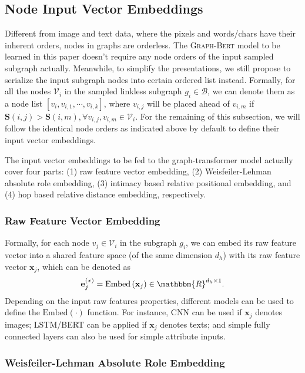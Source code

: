 \documentclass{article}
\newcommand{\mb}{\mathbf}
\newcommand{\mc}{\mathcal}
\newcommand{\our}{\textsc{Graph-Bert}}
\begin{document}
\subsection{Node Input Vector Embeddings}


Different from image and text data, where the pixels and words/chars have their inherent orders, nodes in graphs are orderless. The {\our} model to be learned in this paper doesn't require any node orders of the input sampled subgraph actually. Meanwhile, to simplify the presentations, we still propose to serialize the input subgraph nodes into certain ordered list instead. Formally, for all the nodes $\mc{V}_i$ in the sampled linkless subgraph $g_i \in \mc{B}$, we can denote them as a node list $[v_i, v_{i,1}, \cdots, v_{i,k}]$, where $v_{i,j}$ will be placed ahead of $v_{i,m}$ if $\mb{S}(i,j) > \mb{S}(i,m), \forall v_{i,j}, v_{i,m} \in \mc{V}_i$. For the remaining of this subsection, we will follow the identical node orders as indicated above by default to define their input vector embeddings.

The input vector embeddings to be fed to the graph-transformer model actually cover four parts: (1) raw feature vector embedding, (2) Weisfeiler-Lehman absolute role embedding, (3) intimacy based relative positional embedding, and (4) hop based relative distance embedding, respectively. 



\subsubsection{Raw Feature Vector Embedding}

Formally, for each node $v_j \in \mc{V}_i$ in the subgraph $g_i$, we can embed its raw feature vector into a shared feature space (of the same dimension $d_h$) with its raw feature vector $\mb{x}_j$, which can be denoted as
\begin{equation}
{\mb{e}}_{j}^{(x)} = \mbox{Embed} \left( \mb{x}_j\right) \in \mathbbm{R}^{d_h \times 1}.
\end{equation}
Depending on the input raw features properties, different models can be used to define the $\mbox{Embed}(\cdot)$ function. For instance, CNN can be used if $\mb{x}_j$ denotes images; LSTM/BERT can be applied if $\mb{x}_j$ denotes texts; and simple fully connected layers can also be used for simple attribute inputs.


\subsubsection{Weisfeiler-Lehman Absolute Role Embedding}
\end{document}
